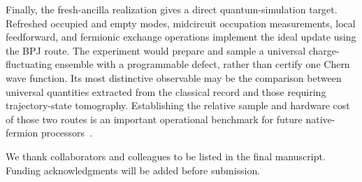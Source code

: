 \documentclass[aps,prx,twocolumn,superscriptaddress,longbibliography,nofootinbib,floatfix]{revtex4-2}
\begin{document}
Finally, the fresh-ancilla realization gives a direct quantum-simulation target.  Refreshed occupied and empty modes, midcircuit occupation measurements, local feedforward, and fermionic exchange operations implement the ideal update using the BPJ route.  The experiment would prepare and sample a universal charge-fluctuating ensemble with a programmable defect, rather than certify one Chern wave function.  Its most distinctive observable may be the comparison between universal quantities extracted from the classical record and those requiring trajectory-state tomography.  Establishing the relative sample and hardware cost of those two routes is an important operational benchmark for future native-fermion processors~\cite{GonzalezCuadraBluvsteinKalinowski2023,CalliariFromonteilCesa2026,OttGonzalezCuadraZache2025,SchuckertCraneGorshkov2024}.

\begin{acknowledgments}
We thank collaborators and colleagues to be listed in the final manuscript.  Funding acknowledgments will be added before submission.
\end{acknowledgments}





\end{document}

